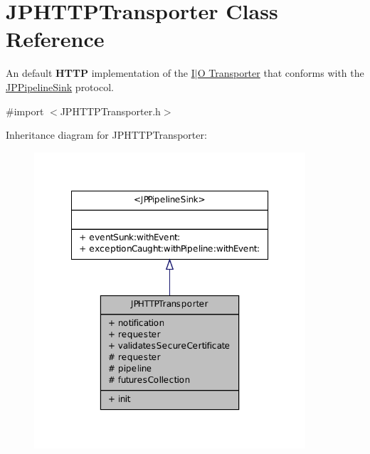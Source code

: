 \hypertarget{a00014}{
\section{JPHTTPTransporter Class Reference}
\label{a00014}
}


An default {\bfseries HTTP} implementation of the \hyperlink{a00002}{I$|$O Transporter} that conforms with the \hyperlink{a00034}{JPPipelineSink} protocol.  




{\ttfamily \#import $<$JPHTTPTransporter.h$>$}



Inheritance diagram for JPHTTPTransporter:\nopagebreak
\begin{figure}[H]
\begin{center}
\leavevmode
\includegraphics[width=286pt]{a00103}
\end{center}
\end{figure}



